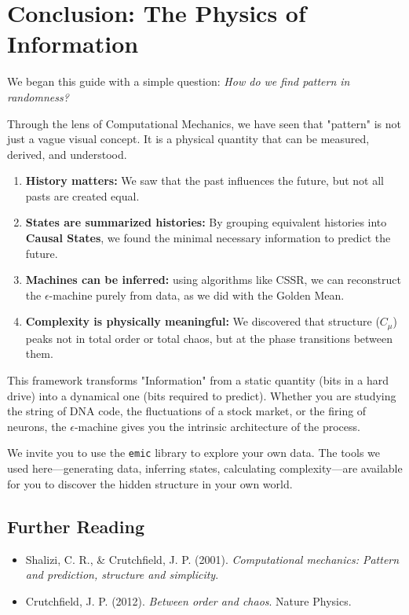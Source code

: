 \section{Conclusion: The Physics of Information}
\label{sec:conclusion}

We began this guide with a simple question: \textit{How do we find pattern in randomness?}

Through the lens of Computational Mechanics, we have seen that "pattern" is not just a vague visual concept. It is a physical quantity that can be measured, derived, and understood.

\begin{enumerate}
    \item \textbf{History matters:} We saw that the past influences the future, but not all pasts are created equal.
    \item \textbf{States are summarized histories:} By grouping equivalent histories into \textbf{Causal States}, we found the minimal necessary information to predict the future.
    \item \textbf{Machines can be inferred:} using algorithms like CSSR, we can reconstruct the $\epsilon$-machine purely from data, as we did with the Golden Mean.
    \item \textbf{Complexity is physically meaningful:} We discovered that structure ($C_\mu$) peaks not in total order or total chaos, but at the phase transitions between them.
\end{enumerate}

This framework transforms "Information" from a static quantity (bits in a hard drive) into a dynamical one (bits required to predict). Whether you are studying the string of DNA code, the fluctuations of a stock market, or the firing of neurons, the $\epsilon$-machine gives you the intrinsic architecture of the process.

We invite you to use the \texttt{emic} library to explore your own data. The tools we used here---generating data, inferring states, calculating complexity---are available for you to discover the hidden structure in your own world.

\subsection*{Further Reading}
\begin{itemize}
    \item Shalizi, C. R., \& Crutchfield, J. P. (2001). \textit{Computational mechanics: Pattern and prediction, structure and simplicity}.
    \item Crutchfield, J. P. (2012). \textit{Between order and chaos}. Nature Physics.
\end{itemize}
